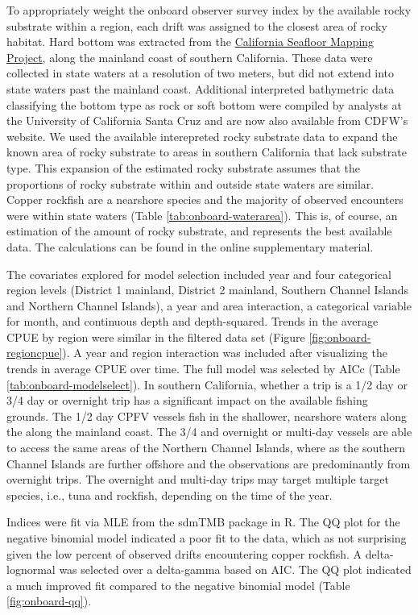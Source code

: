 \documentclass[11pt,
  english,
  letterpaper,
]{article}
\begin{document}
To appropriately weight the onboard observer survey index by the available rocky substrate within a region, each drift was assigned to the closest area of rocky habitat. Hard bottom was extracted from the \href{http://seafloor.otterlabs.org/index.html}{California Seafloor Mapping Project}, along the mainland coast of southern California. These data were collected in state waters at a resolution of two meters, but did not extend into state waters past the mainland coast. Additional interpreted bathymetric data classifying the bottom type as rock or soft bottom were compiled by analysts at the University of California Santa Cruz and are now also available from CDFW's website. We used the available interepreted rocky substrate data to expand the known area of rocky substrate to areas in southern California that lack substrate type. This expansion of the estimated rocky substrate assumes that the proportions of rocky substrate within and outside state waters are similar. Copper rockfish are a nearshore species and the majority of observed encounters were within state waters (Table \ref{tab:onboard-waterarea}). This is, of course, an estimation of the amount of rocky substrate, and represents the best available data. The calculations can be found in the online supplementary material.

The covariates explored for model selection included year and four categorical region levels (District 1 mainland, District 2 mainland, Southern Channel Islands and Northern Channel Islands), a year and area interaction, a categorical variable for month, and continuous depth and depth-squared. Trends in the average CPUE by region were similar in the filtered data set (Figure \ref{fig:onboard-regioncpue}). A year and region interaction was included after visualizing the trends in average CPUE over time. The full model was selected by AICc (Table \ref{tab:onboard-modelselect}). In southern California, whether a trip is a 1/2 day or 3/4 day or overnight trip has a significant impact on the available fishing grounds. The 1/2 day CPFV vessels fish in the shallower, nearshore waters along the along the mainland coast. The 3/4 and overnight or multi-day vessels are able to access the same areas of the Northern Channel Islands, where as the southern Channel Islands are further offshore and the observations are predominantly from overnight trips. The overnight and multi-day trips may target multiple target species, i.e., tuna and rockfish, depending on the time of the year.

Indices were fit via MLE from the sdmTMB package in R. The QQ plot for the negative binomial model indicated a poor fit to the data, which as not surprising given the low percent of observed drifts encountering copper rockfish. A delta-lognormal was selected over a delta-gamma based on AIC. The QQ plot indicated a much improved fit compared to the negative binomial model (Table \ref{fig:onboard-qq}).
\end{document}
